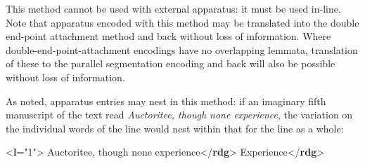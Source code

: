 This method cannot be used with external apparatus: it must be used in-line. Note that apparatus encoded with this method may be translated into the double end-point attachment method and back without loss of information. Where double-end-point-attachment encodings have no overlapping lemmata, translation of these to the parallel segmentation encoding and back will also be possible without loss of information.\par
As noted, apparatus entries may nest in this method: if an imaginary fifth manuscript of the text read \textit{Auctoritee, though none experience}, the variation on the individual words of the line would nest within that for the line as a whole: \par\bgroup{}\exampleFont \begin{shaded}\noindent\mbox{}{<\textbf{l}\hspace*{1em}{n}="{1}">}\mbox{}\newline 
{}\mbox{}\newline 
\hspace*{1em}Auctoritee, though none experience{</\textbf{rdg}>}\mbox{}\newline 
\hspace*{1em}\mbox{}\newline 
\hspace*{1em}\hspace*{1em}\mbox{}\newline 
\hspace*{1em}\hspace*{1em}\hspace*{1em}Experience{</\textbf{rdg}>}\mbox{}\newline 

\end{shaded}
